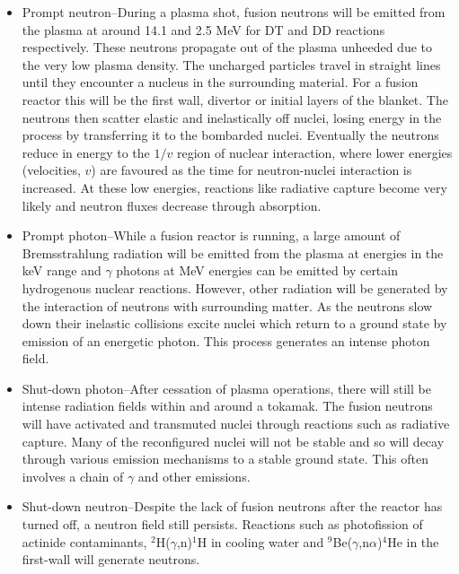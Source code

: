 \begin{itemize}
  \item Prompt neutron--During a plasma shot, fusion neutrons will be emitted from the plasma at around 14.1 and 2.5 MeV for DT and DD reactions respectively. These neutrons propagate out of the plasma unheeded due to the very low plasma density. The uncharged particles travel in straight lines until they encounter a nucleus in the surrounding material. For a fusion reactor this will be the first wall, divertor or initial layers of the blanket. The neutrons then scatter elastic and inelastically off nuclei, losing energy in the process by transferring it to the bombarded nuclei. Eventually the neutrons reduce in energy to the $1/v$ region of nuclear interaction, where lower energies (velocities, $v$) are favoured as the time for neutron-nuclei interaction is increased. At these low energies, reactions like radiative capture become very likely and neutron fluxes decrease through absorption.
  \item Prompt photon--While a fusion reactor is running, a large amount of Bremsstrahlung radiation will be emitted from the plasma at energies in the keV range and $\gamma$ photons at MeV energies can be emitted by certain hydrogenous nuclear reactions. However, other radiation will be generated by the interaction of neutrons with surrounding matter. As the neutrons slow down their inelastic collisions excite nuclei which return to a ground state by emission of an energetic photon. This process generates an intense photon field.
  \item Shut-down photon--After cessation of plasma operations, there will still be intense radiation fields within and around a tokamak. The fusion neutrons will have activated and transmuted nuclei through reactions such as radiative capture. Many of the reconfigured nuclei will not be stable and so will decay through various emission mechanisms to a stable ground state. This often involves a chain of $\gamma$ and other emissions.
  \item Shut-down neutron--Despite the lack of fusion neutrons after the reactor has turned off, a neutron field still persists. Reactions such as photofission of actinide contaminants, $^{2}$H($\gamma$,n)$^{1}$H in cooling water \cite{Kodeli1995} and $^{9}$Be($\gamma$,n$\alpha$)$^{4}$He in the first-wall \cite{Davis2010} will generate neutrons.
\end{itemize}

